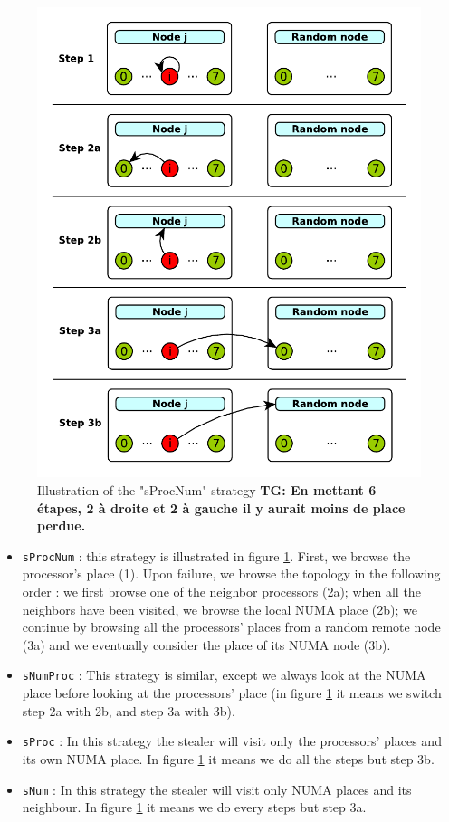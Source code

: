 \documentclass{Styles/llncs}
\newcommand{\TG}[1]{{\color{red}\bfseries TG: #1}}
\begin{document}
\begin{figure}[t]
  \centering
  \includegraphics[scale=0.5]{figures/strategies.pdf}
\caption{Illustration of the "sProcNum" strategy \TG{En mettant 6 étapes, 2 à droite et 2 à gauche il y aurait moins de place perdue.}}
\label{fig:detail-strategy}
\end{figure}
\begin{itemize}
  \item \verb/sProcNum/ : this strategy is illustrated in figure \ref{fig:detail-strategy}.
    First, we browse the processor's place (1). Upon failure, we browse the topology in the following order : we first browse one of the neighbor processors (2a); when all the neighbors have been visited, we browse the local NUMA place (2b); we continue by browsing all the processors' places from a random remote node (3a) and we eventually consider the place of its NUMA node (3b).
  \item \verb/sNumProc/ : This strategy is similar, except we always look at the
    NUMA place before looking at the processors' place (in figure \ref{fig:detail-strategy}
    it means we switch step 2a with 2b, and step 3a with 3b).
  \item \verb/sProc/ : In this strategy the stealer will visit only the
    processors' places and its own NUMA place. In figure \ref{fig:detail-strategy} it means we do
    all the steps but step 3b.
  \item \verb/sNum/ : In this strategy the stealer will visit only NUMA places
    and its neighbour. In figure \ref{fig:detail-strategy} it means we do
    every steps but step 3a.
\end{itemize}
\end{document}
